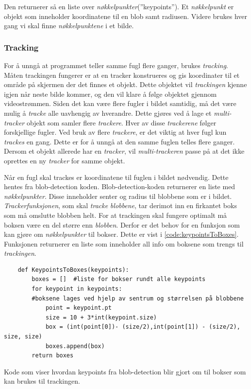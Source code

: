 Den returnerer så en liste over \textit{nøkkelpunkter}(''keypoints''). 
Et \textit{nøkkelpunkt} er objekt som inneholder koordinatene til en blob samt radiusen. 
Videre brukes  hver gang vi skal finne \textit{nøkkelpunktene} i et bilde.

\subsubsection{Tracking}\label{sec:impl:programvare:tracking}
For å unngå at programmet teller samme fugl flere ganger, brukes \textit{tracking}. 
Måten trackingen fungerer er at en tracker konstrueres og gis koordinater til et område på skjermen der det finnes et objekt. 
Dette objektet vil \textit{trackingen} kjenne igjen når neste bilde kommer, og den vil klare å følge objektet gjennom videostrømmen.
Siden det kan være flere fugler i bildet samtidig, må det være mulig å \textit{tracke} alle uavhengig av hverandre. 
Dette gjøres ved å lage et \textit{multi-tracker} objekt som samler flere \textit{trackere}. 
Hver av disse \textit{trackerene} følger forskjellige fugler.
Ved bruk av flere \textit{trackere}, er det viktig at hver fugl kun \textit{trackes} en gang. 
Dette er for å unngå at den samme fuglen telles flere ganger. 
Dersom et objekt allerede har en \textit{tracker}, vil \textit{multi-trackeren} passe på at det ikke oprettes en ny \textit{tracker} for samme objekt.

Når en fugl skal trackes er koordinatene til fuglen i bildet nødvendig. 
Dette hentes fra blob-detection koden. 
Blob-detection-koden returnerer en liste med \textit{nøkkelpunkter}. 
Disse inneholder senter og radius til blobbene som er i bildet.
\textit{Trackerfunksjonen}, som skal \textit{tracke} \textit{blobbene}, tar derimot inn en firkantet boks som må omslutte blobben helt.
For at trackingen skal fungere optimalt må boksen være en del større enn \textit{blobben}.
Derfor er det behov for en funksjon som kan gjøre om \textit{nøkkelpunkter} til bokser. 
Dette er vist i \autoref{code:keypointsToBoxes}. 
Funksjonen  returnerer en liste som inneholder all info om boksene som trengs til \textit{trackingen}.

\begin{listing}[!htb]
\begin{verbatim}
    def KeypointsToBoxes(keypoints):
        boxes = []  #liste for bokser rundt alle keypoints 
        for keypoint in keypoints:
        #boksene lages ved hjelp av sentrum og størrelsen på blobbene
            point = keypoint.pt
            size = 10 + 3*int(keypoint.size)
            box = (int(point[0])- (size/2),int(point[1]) - (size/2), size, size)
            boxes.append(box)
        return boxes
\end{verbatim}
\caption{Kode som viser hvordan keypoints fra blob-detection blir gjort om til bokser som kan brukes til trackingen.}
\label{code:keypointsToBoxes}
\end{listing}

